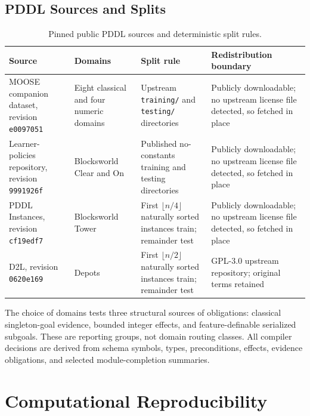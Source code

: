 \subsection{PDDL Sources and Splits}

\begin{table}[htbp]
\centering
\small
\setlength{\tabcolsep}{3pt}
\begin{tabular}{p{}p{}p{}p{}}
\toprule
Source & Domains & Split rule & Redistribution boundary \\
\midrule
MOOSE companion dataset, revision
\texttt{e0097051} \cite{DillonZChenMooseDataset} &
Eight classical and four numeric domains &
Upstream \texttt{training/} and \texttt{testing/} directories &
Publicly downloadable; no upstream license file detected, so fetched in place \\
Learner-policies repository, revision
\texttt{9991926f} \cite{BonetLearnerPoliciesRepository} &
Blocksworld Clear and On &
Published no-constants training and testing directories &
Publicly downloadable; no upstream license file detected, so fetched in place \\
PDDL Instances, revision
\texttt{cf19edf7} \cite{Bacchus2001AIPS00,PotasscoPDDLInstances} &
Blocksworld Tower &
First $\lfloor n/4\rfloor$ naturally sorted instances train; remainder test &
Publicly downloadable; no upstream license file detected, so fetched in place \\
D2L, revision \texttt{0620e169} \cite{RLeapD2LRepository} &
Depots &
First $\lfloor n/2\rfloor$ naturally sorted instances train; remainder test &
GPL-3.0 upstream repository; original terms retained \\
\bottomrule
\end{tabular}
\caption{Pinned public PDDL sources and deterministic split rules.}
\label{tab:data-sources}
\end{table}

The choice of domains tests three structural sources of obligations: classical
singleton-goal evidence, bounded integer effects, and feature-definable
serialized subgoals. These are reporting groups, not domain routing classes.
All compiler decisions are derived from schema symbols, types, preconditions,
effects, evidence obligations, and selected module-completion summaries.

\section{Computational Reproducibility}
\label{app:reproducibility}

